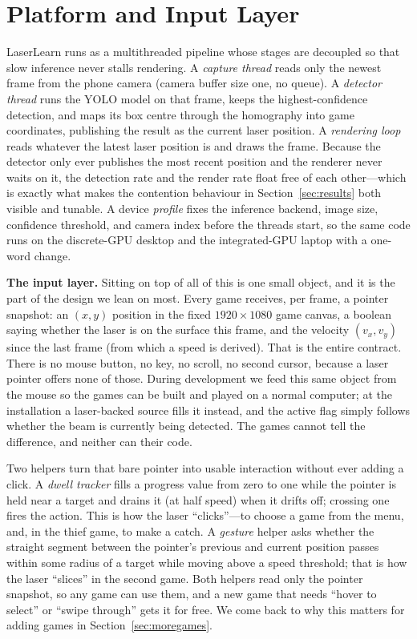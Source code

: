 \documentclass[conference]{IEEEtran}
\begin{document}
\section{Platform and Input Layer}\label{sec:system}
LaserLearn runs as a multithreaded pipeline whose stages are decoupled so that
slow inference never stalls rendering. A \emph{capture thread} reads only the
newest frame from the phone camera (camera buffer size one, no queue). A
\emph{detector thread} runs the YOLO model on that frame, keeps the
highest-confidence detection, and maps its box centre through the homography into
game coordinates, publishing the result as the current laser position. A
\emph{rendering loop} reads whatever the latest laser position is and draws the
frame. Because the detector only ever publishes the most recent position and the
renderer never waits on it, the detection rate and the render rate float free of
each other---which is exactly what makes the contention behaviour in
Section~\ref{sec:results} both visible and tunable. A device \emph{profile} fixes
the inference backend, image size, confidence threshold, and camera index before
the threads start, so the same code runs on the discrete-GPU desktop and the
integrated-GPU laptop with a one-word change.

\noindent\textbf{The input layer.} Sitting on top of all of this is one small
object, and it is the part of the design we lean on most. Every game receives, per
frame, a pointer snapshot: an $(x,y)$ position in the fixed
$1920\times1080$ game canvas, a boolean saying whether the laser is on the surface
this frame, and the velocity $(v_x,v_y)$ since the last frame (from which a speed
is derived). That is the entire contract. There is no mouse button, no key, no
scroll, no second cursor, because a laser pointer offers none of those. During
development we feed this same object from the mouse so the games can be built and
played on a normal computer; at the installation a laser-backed source fills it
instead, and the active flag simply follows whether the beam is currently being
detected. The games cannot tell the difference, and neither can their code.

Two helpers turn that bare pointer into usable interaction without ever adding a
click. A \emph{dwell tracker} fills a progress value from zero to one while the
pointer is held near a target and drains it (at half speed) when it drifts off;
crossing one fires the action. This is how the laser ``clicks''---to choose a game
from the menu, and, in the thief game, to make a catch. A \emph{gesture} helper
asks whether the straight segment between the pointer's previous and current
position passes within some radius of a target while moving above a speed
threshold; that is how the laser ``slices'' in the second game. Both helpers read
only the pointer snapshot, so any game can use them, and a new game that needs
``hover to select'' or ``swipe through'' gets it for free. We come back to why
this matters for adding games in Section~\ref{sec:moregames}.
\end{document}
